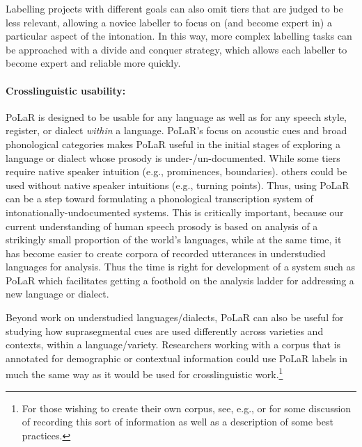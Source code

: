 \documentclass[11pt, twoside]{memoir}
\begin{document}
Labelling projects with different goals can also omit tiers that are judged to be less relevant, allowing a novice labeller to focus on (and become expert in) a particular aspect of the intonation.  In this way, more complex labelling tasks can be approached with a divide and conquer strategy, which allows each labeller to become expert and reliable more quickly. 

\paragraph{Crosslinguistic usability:}
PoLaR is designed to be usable for any language as well as for any speech style, register, or dialect \emph{within} a language. PoLaR’s focus on acoustic cues and broad phonological categories makes PoLaR useful in the initial stages of exploring a language or dialect whose prosody is under-\slash un-documented.  While some tiers require native speaker intuition (e.g., prominences, boundaries). others could be used without native speaker intuitions (e.g., turning points).  Thus, using PoLaR can be a step toward formulating a phonological transcription system of intonationally-undocumented systems.  This is critically important, because our current understanding of human speech prosody is based on analysis of a strikingly small proportion of the world’s languages, while at the same time, it has become easier to create corpora of recorded utterances in understudied languages for analysis.  Thus the time is right for development of a system such as PoLaR which facilitates getting a foothold on the analysis ladder for addressing a new language or dialect. 

Beyond work on understudied languages\slash dialects, PoLaR can also be useful for studying how suprasegmental cues are used differently across varieties and contexts, within a language\slash variety. Researchers working with a corpus that is annotated for demographic or contextual information could use PoLaR labels in much the same way as it would be used for crosslinguistic work.\footnote{For those wishing to create their own corpus, see, e.g., \citealt{meyerhoff-11} or \citealt{podesvasharma13} for some discussion of recording this sort of information as well as a description of some best practices.}
\end{document}

